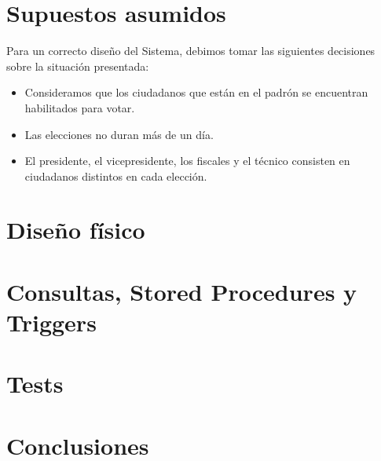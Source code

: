 \documentclass[10pt,a4paper]{article}
\begin{document}
\section{Supuestos asumidos}
Para un correcto diseño del Sistema, debimos tomar las siguientes decisiones sobre la situación presentada:
\begin{itemize}
\item Consideramos que los ciudadanos que están en el padrón se encuentran habilitados para votar.
\item Las elecciones no duran más de un día.
\item El presidente, el vicepresidente, los fiscales y el técnico consisten en ciudadanos distintos en cada elección.
\end{itemize}
\newpage


\section{Diseño físico}

\newpage
\section{Consultas, Stored Procedures y Triggers}

\newpage
\section{Tests}

\newpage
\section{Conclusiones}
\end{document}
